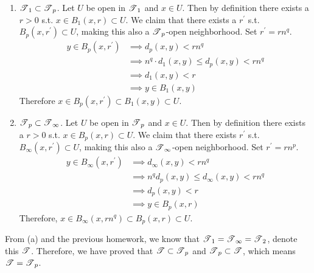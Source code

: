 \begin{solution}[Munkres 20.1.b]
    \begin{enumerate} 
      \item $\operatorname{\mathscr{T}}_1 \subset \operatorname{\mathscr{T}}_p$. Let $U$ be open in $\operatorname{\mathscr{T}}_1$ and $x \in U$. Then by definition there exists a $r > 0$ s.t. $x \in B_1 (x, r) \subset U$. We claim that there exists a $r^\prime$ s.t. $B_p (x, r^\prime) \subset U$, making this also a $\operatorname{\mathscr{T}}_p$-open neighborhood. Set $r^\prime = r n^q$. 
      \begin{align}
        y \in B_p (x, r^\prime) & \implies d_p (x, y) < r n^q \\
                                & \implies n^q \cdot d_1 (x, y) \leq d_p (x, y) < r n^q \\
                                & \implies d_1 (x, y) < r \\
                                & \implies y \in B_1 (x, y)
      \end{align}
      Therefore $x \in B_p (x, r^\prime) \subset B_1 (x, y) \subset U$. 

      \item $\operatorname{\mathscr{T}}_p \subset \operatorname{\mathscr{T}}_\infty$. Let $U$ be open in $\operatorname{\mathscr{T}}_p$ and $x \in U$. Then by definition there exists a $r > 0$ s.t. $x \in B_p (x, r) \subset U$. We claim that there exists $r^\prime$ s.t. $B_\infty (x, r^\prime) \subset U$, making this also a $\operatorname{\mathscr{T}}_\infty$-open neighborhood. Set $r^\prime = r n^p$. 
      \begin{align}
        y \in B_\infty (x, r^\prime) & \implies d_\infty (x, y) < r n^q \\
                                     & \implies n^q d_p (x, y) \leq d_\infty (x, y) < r n^q  \\
                                     & \implies d_p (x, y) < r \\
                                     & \implies y \in B_p (x, r)
      \end{align}
      Therefore, $x \in B_\infty (x, r n^q) \subset B_p (x, r) \subset U$. 
    \end{enumerate} 

    From (a) and the previous homework, we know that $\operatorname{\mathscr{T}}_1 = \operatorname{\mathscr{T}}_\infty = \operatorname{\mathscr{T}}_2$, denote this $\operatorname{\mathscr{T}}$. Therefore, we have proved that $\operatorname{\mathscr{T}} \subset \operatorname{\mathscr{T}}_p$ and $\operatorname{\mathscr{T}}_p \subset \operatorname{\mathscr{T}}$, which means $\operatorname{\mathscr{T}} = \operatorname{\mathscr{T}}_p$. 
  \end{solution}

